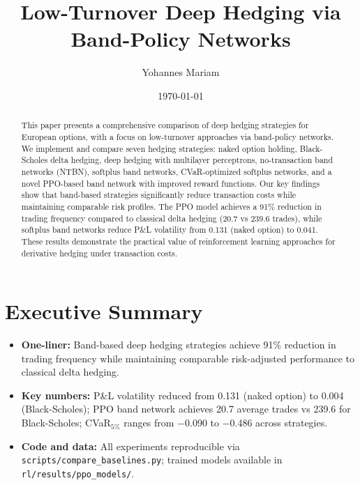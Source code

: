 \documentclass[11pt,letterpaper]{article}
\begin{document}
\title{\bfseries Low-Turnover Deep Hedging via Band-Policy Networks}
\author{Yohannes Mariam}
\date{\today}
\maketitle

\begin{abstract}
\noindent
{\small
This paper presents a comprehensive comparison of deep hedging strategies for European options, with a focus on low-turnover approaches via band-policy networks. We implement and compare seven hedging strategies: naked option holding, Black-Scholes delta hedging, deep hedging with multilayer perceptrons, no-transaction band networks (NTBN), softplus band networks, CVaR-optimized softplus networks, and a novel PPO-based band network with improved reward functions. Our key findings show that band-based strategies significantly reduce transaction costs while maintaining comparable risk profiles. The PPO model achieves a 91\% reduction in trading frequency compared to classical delta hedging (20.7 vs 239.6 trades), while softplus band networks reduce P\&L volatility from 0.131 (naked option) to 0.041. These results demonstrate the practical value of reinforcement learning approaches for derivative hedging under transaction costs.
}
\end{abstract}

\section{Executive Summary}
\begin{itemize}
  \item \textbf{One-liner:} Band-based deep hedging strategies achieve 91\% reduction in trading frequency while maintaining comparable risk-adjusted performance to classical delta hedging.
  \item \textbf{Key numbers:} P\&L volatility reduced from \num{0.131} (naked option) to \num{0.004} (Black-Scholes); PPO band network achieves \num{20.7} average trades vs \num{239.6} for Black-Scholes; CVaR$_{5\%}$ ranges from \num{-0.090} to \num{-0.486} across strategies.
  \item \textbf{Code and data:} All experiments reproducible via \texttt{scripts/compare\_baselines.py}; trained models available in \texttt{rl/results/ppo\_models/}.
\end{itemize}
\end{document}
